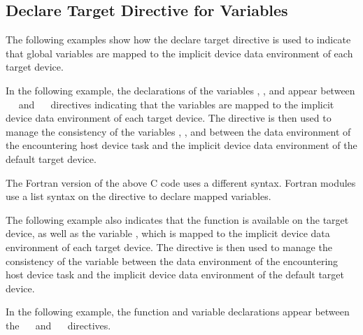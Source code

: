 \cppspecificend

\subsection{Declare Target Directive for Variables}
\label{subsec:declare_target_variables}



The following examples show how the declare target directive is used to indicate that
global variables are mapped to the implicit device data environment of each target device.

In the following example, the declarations of the variables , , and  appear 
between ~~ and ~~ 
directives indicating that the variables are mapped to the implicit device data 
environment of each target device. The   directive 
is then used to manage the consistency of the variables , , and  between the 
data environment of the encountering host device task and the implicit device data 
environment of the default target device.


The Fortran version of the above C code uses a different syntax. Fortran modules 
use a list syntax on the   directive to declare 
mapped variables.


The following example also indicates that the function  is available on the 
target device, as well as the variable , which is mapped to the implicit device 
data environment of each target device. The   directive 
is then used to manage the consistency of the variable  between the data environment 
of the encountering host device task and the implicit device data environment of 
the default target device.

In the following example, the function and variable declarations appear between 
the ~~ and ~~ 
directives.

